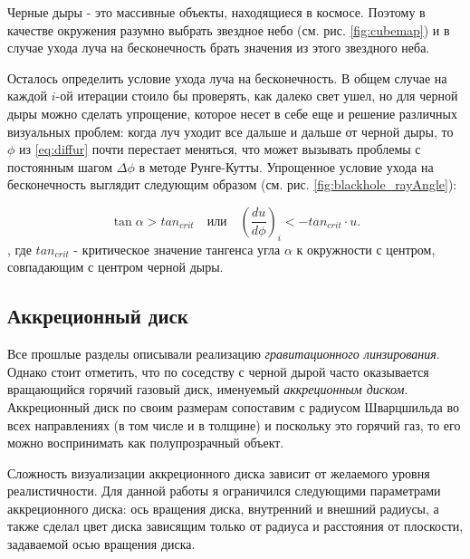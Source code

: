 Черные дыры - это массивные объекты, находящиеся в космосе. Поэтому в качестве окружения разумно выбрать звездное небо (см. рис. \ref{fig:cubemap}) и в случае ухода луча на бесконечность брать значения из этого звездного неба.

Осталось определить условие ухода луча на бесконечность. В общем случае на каждой $i$-ой итерации стоило бы проверять, как далеко свет ушел, но для черной дыры можно сделать упрощение, которое несет в себе еще и решение различных визуальных проблем: когда луч уходит все дальше и дальше от черной дыры, то $\phi$ из \eqref{eq:diffur} почти перестает меняться, что может вызывать проблемы с постоянным шагом $\Delta\phi$ в методе Рунге-Кутты. Упрощенное условие ухода на бесконечность выглядит следующим образом (см. рис. \ref{fig:blackhole_rayAngle}):

\begin{equation}
\label{eq:goes_to_infinity}
    \tan{\alpha} > tan_{crit} \quad \textit{или} \quad \left(\frac{du}{d\phi}\right)_i < -tan_{crit} \cdot u.
\end{equation}
, где $tan_{crit}$ - критическое значение тангенса угла $\alpha$ к окружности с центром, совпадающим с центром черной дыры.

\subsection{Аккреционный диск}
\label{subsec:accr_disk}

Все прошлые разделы описывали реализацию \textit{гравитационного линзирования}. Однако стоит отметить, что по соседству с черной дырой часто оказывается вращающийся горячий газовый диск, именуемый \textit{аккреционным диском}. Аккреционный диск по своим размерам сопоставим с радиусом Шварцшильда во всех направлениях (в том числе и в толщине) и поскольку это горячий газ, то его можно воспринимать как полупрозрачный объект.

Сложность визуализации аккреционного диска зависит от желаемого уровня реалистичности. Для данной работы я ограничился следующими параметрами аккреционного диска: ось вращения диска, внутренний и внешний радиусы, а также сделал цвет диска зависящим только от радиуса и расстояния от плоскости, задаваемой осью вращения диска.

\newpage
